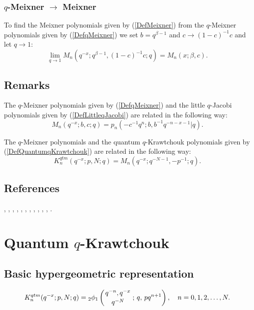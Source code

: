 \documentclass[envcountchap,graybox]{svmono}
\newcounter{rom}
\newcommand{\qhyp}[5]{\mbox{}_{#1}{\phi}_{#2}
\left(\genfrac{}{}{0pt}{}{#3}{#4}\,;\,q,\,#5\right)}
\newcommand{\qhyp}[5]{\,\mbox{}_{#1}\phi_{#2}\!\left(
  \genfrac{}{}{0pt}{}{#3}{#4};#5\right)}
\begin{document}
\subsubsection*{$q$-Meixner $\rightarrow$ Meixner}
To find the Meixner polynomials given by (\ref{DefMeixner}) from the $q$-Meixner polynomials given by
(\ref{DefqMeixner}) we set $b=q^{\beta-1}$ and $c\rightarrow (1-c)^{-1}c$ and let $q\rightarrow 1$:
\begin{equation}
\lim_{q\rightarrow 1}M_n(q^{-x};q^{\beta-1},(1-c)^{-1}c;q)=M_n(x;\beta,c).
\end{equation}

\subsection*{Remarks}
The $q$-Meixner polynomials given by (\ref{DefqMeixner}) and the little
$q$-Jacobi polynomials given by (\ref{DefLittleqJacobi}) are related in the
following way:
$$M_n(q^{-x};b,c;q)=p_n(-c^{-1}q^n;b,b^{-1}q^{-n-x-1}|q).$$

\noindent
The $q$-Meixner polynomials and the quantum $q$-Krawtchouk polynomials
given by (\ref{DefQuantumqKrawtchouk}) are related in the following way:
$$K_n^{qtm}(q^{-x};p,N;q)=M_n(q^{-x};q^{-N-1},-p^{-1};q).$$

\subsection*{References}
\cite{AlSalam90}, \cite{AlSalamVerma82II}, \cite{AlSalamVerma88}, \cite{AlvarezRonveaux},
\cite{AtakAtakKlimyk}, \cite{AtakRahmanSuslov}, \cite{Campigotto+}, \cite{GasperRahman90},
\cite{Hahn}, \cite{Ismail2005I}, \cite{Nikiforov+}, \cite{Smirnov}.


\section{Quantum $q$-Krawtchouk}
\par\setcounter{equation}{0}

\subsection*{Basic hypergeometric representation}
\begin{equation}
\label{DefQuantumqKrawtchouk}
K_n^{qtm}(q^{-x};p,N;q)=
\qhyp{2}{1}{q^{-n},q^{-x}}{q^{-N}}{pq^{n+1}},\quad n=0,1,2,\ldots,N.
\end{equation}
\end{document}
